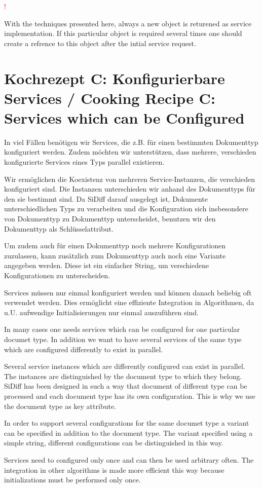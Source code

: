 \documentclass[10pt,a4paper]{scrartcl}
\newcommand{\hinweis}[1]{
\begin{framed}
\begin{minipage}[t]{0.02\textwidth}
\textcolor{red}{\Huge{\sffamily !}}
\end{minipage}
\begin{minipage}[t]{0.94\textwidth}
#1
\end{minipage}
\end{framed}
}
\providecommand{\deng}[2]{#1 / {\sffamily #2}}
\providecommand{\deutsch}[1]{#1}
\providecommand{\englisch}[1]{{\sffamily #1}}
\begin{document}
\englisch{\hinweis{With the techniques presented here, always a new object is returened as service implementation. If this particular object is required several times one should create a refrence to this object after the intial service request.}}



\clearpage
\section{\deng{Kochrezept C: Konfigurierbare Services}{Cooking Recipe C: Services which can be Configured}}
\deutsch{In viel Fällen benötigen wir Services, die z.B. für einen bestimmten
Dokumenttyp konfiguriert werden. Zudem möchten wir unterstützen, dass mehrere,
verschieden konfigurierte Services eines Typs parallel existieren.

Wir ermöglichen die Koexistenz von mehreren Service-Instanzen, die verschieden
konfiguriert sind. Die Instanzen unterschieden wir anhand des Dokumenttyps für
den sie bestimmt sind. Da SiDiff darauf ausgelegt ist, Dokumente 
unterschiedlichen Typs zu verarbeiten und die Konfiguration sich insbesondere
von Dokumenttyp zu Dokumenttyp unterscheidet, benutzen wir den Dokumenttyp als 
Schlüsselattribut.

Um zudem auch für einen Dokumenttyp noch mehrere Konfigurationen zuzulassen, kann 
zusätzlich zum Dokumenttyp auch noch eine Variante angegeben werden. Diese ist
ein einfacher String, um verschiedene Konfigurationen zu unterscheiden.

Services müssen nur einmal konfiguriert werden und können danach beliebig oft
verwendet werden. Dies ermöglicht eine effiziente Integration in Algorithmen,
da u.U. aufwendige Initialisierungen nur einmal auszuführen sind.}

\englisch{In many cases one needs services which can be configured for one
particular documet type. In addition we want to have several
services of the same type which are configured differently to exist in parallel.

Several service instances which are differently configured can exist in parallel.
The instances are distinguished by the document type to which they belong.
SiDiff has been designed in such a way that document of different type can be
processed and each document type has its own configuration. This is why we use
the document type as key attribute.

In order to support several configurations for the same documet type a variant
can be specified in addition to the document type. The variant specified using a
simple string, different configurations can be distinguished in this way.

Services need to configured only once and can then be used arbitrary often. The
integration in other algorithms is made more efficient this way because
initializations must be performed only once.}
\end{document}
